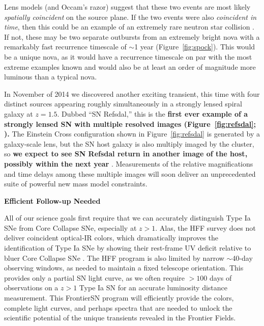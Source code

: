\documentclass[12pt]{article}
\begin{document}
Lens models (and Occam's razor) suggest that these two events are most
likely {\it spatially coincident} on the source plane.  If the two
events were also {\it coincident in time}, then this could be an
example of an extremely rare neutron star collision \citep[a
  ``kilonova'';][]{Li:1998,Tanvir:2013,Kasen:2014,Metzger:2015}.  If not,
these may be two separate outbursts from an extremely bright nova with
a remarkably fast recurrence timescale of $\sim$1 year
(Figure~\ref{fig:spock}).  This would be a
unique nova, as it would have a recurrence timescale on par with the
most extreme examples known \citep{Tang:2014} and would also be at
least an order of magnitude more luminous than a typical nova.

In November of 2014 we discovered another exciting transient, this
time with four distinct sources appearing roughly simultaneously in a
strongly lensed spiral galaxy at $z=1.5$.  Dubbed ``SN Refsdal,'' this
is the {\bf first ever example of a strongly lensed SN with multiple
  resolved images (Figure~\ref{fig:refsdal}; \citealt{Kelly:2015}).}
The Einstein Cross configuration shown in Figure~\ref{fig:refsdal} is
generated by a galaxy-scale lens, but the SN host galaxy is also
multiply imaged by the cluster, so {\bf we expect to see SN Refsdal
  return in another image of the host, possibly within the next year}
\citep{Oguri:2015,Sharon:2015}.  Measurements of the relative
magnifications and time delays among these multiple images will soon
deliver an unprecedented suite of powerful new mass model constraints.

\bigskip
\centerline {\bf Efficient Follow-up Needed} 
\medskip

All of our science goals first require that we can accurately
distinguish Type Ia SNe from Core Collapse SNe, especially at $z>1$.
Alas, the HFF survey does not deliver coincident optical-IR colors,
which dramatically improves the identification of Type Ia SNe by
showing their rest-frame UV deficit relative to bluer Core Collapse
SNe \citep{Riess:2004a,Rodney:2012}.  The HFF program is also limited
by narrow $\sim$40-day observing windows, as needed to maintain a
fixed telescope orientation.  This provides only a partial SN light
curve, as we often require $>100$ days of observations on a $z>1$ Type
Ia SN for an accurate luminosity distance measurement.  This
FrontierSN program will efficiently provide the colors, complete light
curves, and perhaps spectra that are needed to unlock the
scientific potential of the unique transients revealed in the Frontier
Fields.
\end{document}
